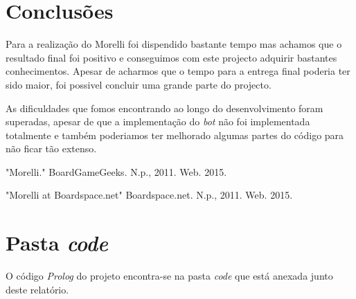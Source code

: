 \documentclass[a4paper]{article}
\begin{document}
\section{Conclusões}
Para a realização do Morelli foi dispendido bastante tempo mas achamos que o resultado final foi positivo e conseguimos com este projecto adquirir bastantes conhecimentos. Apesar de acharmos que o tempo para a entrega final poderia ter sido maior, foi possivel concluir uma grande parte do projecto. 
\par As dificuldades que fomos encontrando ao longo do desenvolvimento foram superadas, apesar de que a implementação do \textit{bot} não foi implementada totalmente e também poderiamos ter melhorado algumas partes do código para não ficar tão extenso. 



\clearpage
{}
\renewcommand\refname{Bibliografia}


\par [1] "Morelli." BoardGameGeeks. N.p., 2011. Web. 2015.
\par [2] "Morelli at Boardspace.net"  Boardspace.net. N.p., 2011. Web. 2015.

\newpage
\appendix
\section{Pasta \textit{code}}
O código \textit{Prolog} do projeto encontra-se na pasta \textit{code} que está anexada junto deste relatório.
\end{document}
